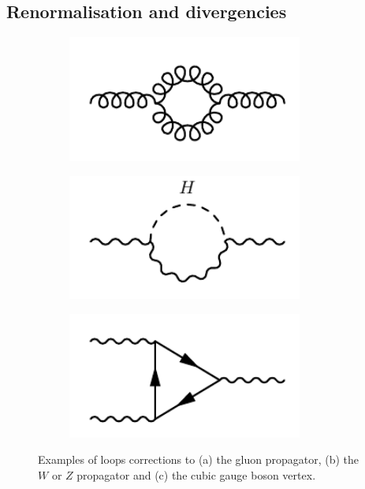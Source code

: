 \subsection{Renormalisation and divergencies}
\label{ch:renormalisation}

\begin{figure}
	\centering
	\begin{subfigure}[b]{0.33\linewidth}
		\centering\includegraphics[width=0.85\textwidth]{gluon_loop}
		\caption{\label{fig:gluon_loop}}
	\end{subfigure}%
	\begin{subfigure}[b]{0.33\linewidth}
		\centering\includegraphics[width=0.85\textwidth]{wz_propagator}
		\caption{\label{fig:wz_propagator}}
	\end{subfigure}	
	\begin{subfigure}[b]{0.33\linewidth}
		\centering\includegraphics[width=0.85\textwidth]{cubic_vertex}
		\caption{\label{fig:cubic_vertex}}
	\end{subfigure}
	\caption{Examples of loops corrections to (a) the gluon propagator, (b) the $W$ or $Z$ propagator and (c) the cubic gauge boson vertex.}\label{fig:loop_corrections}
\end{figure}

